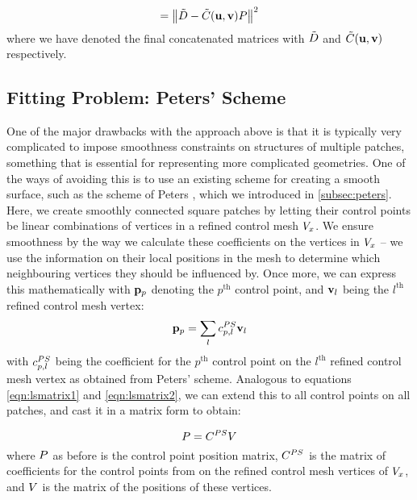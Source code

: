 \begin{equation}
\label{eq:lsconcatmat}
= \norm{\lsDataPointConcMatrix - \lsControlCoefConcMatrix(\vec{u},\vec{v}) \lsControlPointMatrix }^2
\end{equation}
where we have denoted the final concatenated matrices with $\lsDataPointConcMatrix$ and $ \lsControlCoefConcMatrix(\vec{u},\vec{v})$ respectively.

\subsection{Fitting Problem: Peters' Scheme}
\label{subsub:petersleastsq}
One of the major drawbacks with the approach above is that it is typically very complicated to impose smoothness constraints on structures of multiple patches, something that is essential for representing more complicated geometries. One of the ways of avoiding this is to use an existing scheme for creating a smooth surface, such as the scheme of Peters \cite{peters1992constructing,eck1996automatic}, which we introduced in \autoref{subsec:peters}. Here, we create smoothly connected square \Bez patches by letting their control points be linear combinations of vertices in a refined control mesh $\petersPatchPoints$. We ensure smoothness by the way we calculate these coefficients on the vertices in $\petersPatchPoints$ -- we use the information on their local positions in the mesh to determine which neighbouring vertices they should be influenced by. Once more, we can express this mathematically with $\lsControlPointi{p}$ denoting the $p^\text{th}$ control point, and $\petersPatchPointVec_l$ being the $l^\text{th}$ refined control mesh vertex:
\begin{equation}
\lsControlPointi{p} = \sum\limits_{l} \petersControlPointCoef_{p,l} \petersPatchPointVec_l
\end{equation} 
with $\petersControlPointCoef_{p,l}$ being the coefficient for the $p^\text{th}$ \Bez control point on the $l^\text{th}$ refined control mesh vertex as obtained from Peters' scheme. Analogous to equations \ref{eqn:lsmatrix1} and \ref{eqn:lsmatrix2}, we can extend this to all \Bez control points on all patches, and cast it in a matrix form to obtain:

\begin{equation}
\lsControlPointMatrix = \petersControlPointCoefMatrix\petersPatchPointMatrix
\end{equation}
where $\lsControlPointMatrix$ as before is the \Bez control point position matrix, $\petersControlPointCoefMatrix$ is the matrix of coefficients for the \Bez control points from on the refined control mesh vertices of $\petersPatchPoints$, and $\petersPatchPointMatrix$ is the matrix of the positions of these vertices. 

